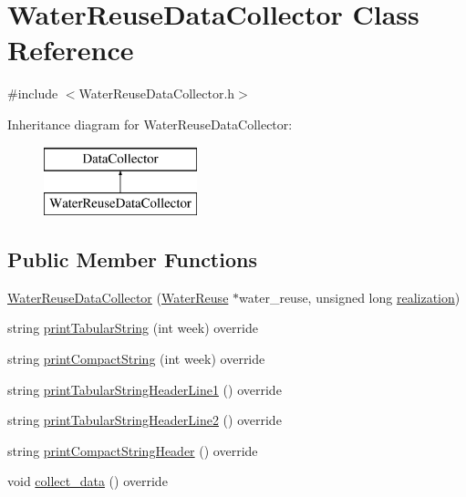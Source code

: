 \hypertarget{classWaterReuseDataCollector}{}\section{Water\+Reuse\+Data\+Collector Class Reference}
\label{classWaterReuseDataCollector}


{\ttfamily \#include $<$Water\+Reuse\+Data\+Collector.\+h$>$}

Inheritance diagram for Water\+Reuse\+Data\+Collector\+:\begin{figure}[H]
\begin{center}
\leavevmode
\includegraphics[height=2.000000cm]{classWaterReuseDataCollector}
\end{center}
\end{figure}
\subsection*{Public Member Functions}
\begin{DoxyCompactItemize}
\item 
\mbox{\hyperlink{classWaterReuseDataCollector_a0bd64f585d6645023f6cf5a485a89416}{Water\+Reuse\+Data\+Collector}} (\mbox{\hyperlink{classWaterReuse}{Water\+Reuse}} $\ast$water\+\_\+reuse, unsigned long \mbox{\hyperlink{classDataCollector_a9ef2887466fe3123aa19ef956a219b96}{realization}})
\item 
string \mbox{\hyperlink{classWaterReuseDataCollector_af8b637ad080f354dc145f11580834da8}{print\+Tabular\+String}} (int week) override
\item 
string \mbox{\hyperlink{classWaterReuseDataCollector_a6b37aa4b2031cf0a1a1326da2bd64420}{print\+Compact\+String}} (int week) override
\item 
string \mbox{\hyperlink{classWaterReuseDataCollector_a1065ad3627b913dccb6ecbf0e6acc6e6}{print\+Tabular\+String\+Header\+Line1}} () override
\item 
string \mbox{\hyperlink{classWaterReuseDataCollector_a8cead3771efabeb62dcf069008810f43}{print\+Tabular\+String\+Header\+Line2}} () override
\item 
string \mbox{\hyperlink{classWaterReuseDataCollector_afef08bead3f2c60c2b9c975864456ef1}{print\+Compact\+String\+Header}} () override
\item 
void \mbox{\hyperlink{classWaterReuseDataCollector_af4d8d437372c06d84ff889a5288cc96e}{collect\+\_\+data}} () override
\end{DoxyCompactItemize}
